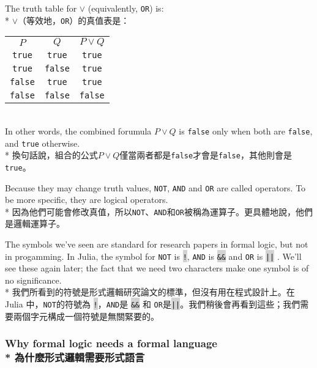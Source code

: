 \documentclass[]{article}
\newcommand{\codequote}[1]{\colorbox{lightgray}{\tt #1}}
\begin{document}
{\color{gray}The truth table for $ \lor $ (equivalently, {\tt OR}) is: }
\\*
{$ \lor $（等效地，{\tt OR}）的真值表是：}\\
\begin{tabular}{|c|c|c|}
	$ P $         & $ Q $           & $ P \lor Q $ \\
	{\tt true}  &  {\tt true}   & {\tt true}          \\
	{\tt true}  & {\tt false}	& {\tt true}       \\
	{\tt false} &  {\tt true}   & {\tt true}       \\
	{\tt false} & {\tt false}	& {\tt false}
\end{tabular} \\
{\color{gray}In other words, the combined forumula $ P\lor Q $ is {\tt false} only when both are {\tt false}, and {\tt true} otherwise.}
\\*
{換句話說，組合的公式$ P \lor Q $僅當兩者都是{\tt false}才會是{\tt false}，其他則會是{\tt true}。}

{\color{gray}Because they may change truth values, {\tt NOT}, {\tt AND} and {\tt OR} are called operators. To be more specific, they are logical operators.}
\\*
{因為他們可能會修改真值，所以{\tt NOT}、{\tt AND}和{\tt OR}被稱為運算子。更具體地說，他們是邏輯運算子。}

{\color{gray}The symbols we've seen are standard for research papers in formal logic, but not in progamming. In Julia, the symbol for {\tt NOT} is \codequote{!}, {\tt AND} is \codequote{\&\&} and {\tt OR} is \codequote{||} . We'll see these again later; the fact that we need two characters make one symbol is of no significance.}
\\*
{我們所看到的符號是形式邏輯研究論文的標準，但沒有用在程式設計上。在 Julia 中，{\tt NOT}的符號為 \codequote{!}，{\tt AND}是 \codequote{\&\&} 和 {\tt OR}是\codequote{||}。我們稍後會再看到這些；我們需要兩個字元構成一個符號是無關緊要的。}

\subsubsection*{{\color{gray}Why formal logic needs a formal language}
\\*
{為什麼形式邏輯需要形式語言}}
\end{document}
